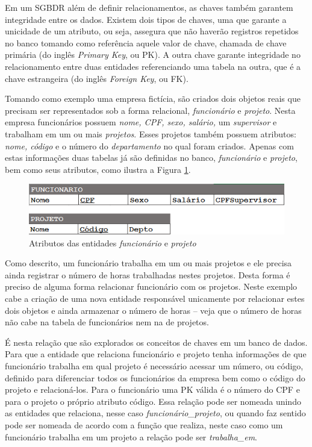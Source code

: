 Em um SGBDR além de definir relacionamentos, as chaves também garantem integridade entre os dados. 
Existem dois tipos de chaves, uma que garante a unicidade de um atributo, ou seja, assegura que 
não haverão registros repetidos no banco tomando como referência aquele valor de chave, chamada de chave primária (do inglês \textit{Primary Key}, ou PK). A outra chave garante integridade no relacionamento entre duas entidades referenciando uma tabela na outra, que 
é a chave estrangeira (do inglês \textit{Foreign Key}, ou FK).

Tomando como exemplo uma empresa fictícia, são criados dois objetos reais que precisam ser 
representados sob a forma relacional, \textit{funcionário} e \textit{projeto}. Nesta empresa funcionários possuem \textit{nome, 
CPF, sexo, salário,} um \textit{supervisor} e trabalham em um ou mais \textit{projetos}. Esses projetos também possuem atributos: 
\textit{nome, código} e o número do \textit{departamento} no qual foram criados. Apenas com estas informações duas tabelas já são definidas 
no banco, \textit{funcionário} e \textit{projeto}, bem como seus atributos, como ilustra a Figura \ref{fig:func_proj}.

\begin{figure}[htpb]
	\centering
		\includegraphics[width=13cm]{funcionario_projeto}
	\caption{Atributos das entidades \textit{funcionário} e \textit{projeto}}
	\label{fig:func_proj}
\end{figure}

Como descrito, um funcionário trabalha em um ou mais projetos e ele precisa ainda registrar o número 
de horas trabalhadas nestes projetos. Desta forma é preciso de alguma forma relacionar funcionário com os projetos. 
Neste exemplo cabe a criação de uma nova entidade responsável unicamente por relacionar estes dois objetos e ainda 
armazenar o número de horas -- veja que o número de horas não cabe na tabela de funcionários nem na de projetos.

É nesta relação que são explorados os conceitos de chaves em um banco de dados. Para que a entidade que relaciona 
funcionário e projeto tenha informações de que funcionário trabalha em qual projeto é necessário acessar um número, ou código, 
definido para diferenciar todos os funcionários da empresa bem como o código do projeto e relacioná-los. Para o funcionário 
uma PK válida é o número do CPF e para o projeto o próprio atributo código. Essa relação pode ser nomeada unindo 
as entidades que relaciona, nesse caso \textit{funcionário\_projeto}, ou quando faz sentido pode ser nomeada de acordo com a função 
que realiza, neste caso como um funcionário trabalha em um projeto a relação pode ser \textit{trabalha\_em}.

